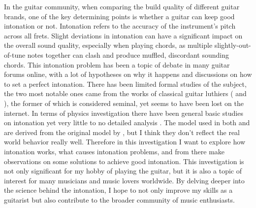 In the guitar community, when comparing the build quality of different guitar brands, one of the key determining points is whether a guitar can keep good intonation or not. Intonation refers to the accuracy of the instrument’s pitch across all frets. Slight deviations in intonation can have a significant impact on the overall sound quality, especially when playing chords, as multiple slightly-out-of-tune notes together can clash and produce muffled, discordant sounding chords. This intonation problem has been a topic of debate in many guitar forums online, with a lot of hypotheses on why it happens and discussions on how to set a perfect intonation. There has been limited formal studies of the subject, the two most notable ones came from the works of classical guitar luthiers (\cite{bartolinis} and \cite{byers}), the former of which is considered seminal, yet seems to have been lost on the internet. In terms of physics investigation there have been general basic studies on intonation yet very little to no detailed analysis \cite{varieschi}. The model used in both \cite{byers} and \cite{varieschi} are derived from the original model by \cite{bartolinis}, but I think they don't reflect the real world behavior really well. Therefore in this investigation I want to explore how intonation works, what causes intonation problems, and from there make observations on some solutions to achieve good intonation. This investigation is not only significant for my hobby of playing the guitar, but it is also a topic of interest for many musicians and music lovers worldwide. By delving deeper into the science behind the intonation, I hope to not only improve my skills as a guitarist but also contribute to the broader community of music enthusiasts.
